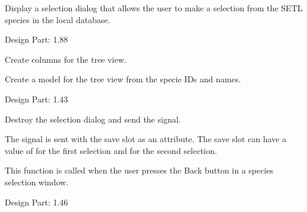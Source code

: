\documentclass[letterpaper,10pt,english]{sphinxmanual}
\begin{document}

\begin{fulllineitems}
\label{setlyze/gui:setlyze.gui.SelectSpecies}
Display a selection dialog that allows the user to make a
selection from the SETL species in the local database.

Design Part: 1.88

\begin{fulllineitems}
\label{setlyze/gui:setlyze.gui.SelectSpecies.create_columns}
Create columns for the tree view.

\end{fulllineitems}


\begin{fulllineitems}
\label{setlyze/gui:setlyze.gui.SelectSpecies.create_model}
Create a model for the tree view from the specie IDs and
names.

Design Part: 1.43

\end{fulllineitems}


\begin{fulllineitems}
\label{setlyze/gui:setlyze.gui.SelectSpecies.on_back}
Destroy the selection dialog and send the
 signal.

The  signal is sent with the save slot
as an attribute. The save slot can have a value of  for the
first selection and  for the second selection.

This function is called when the user presses the Back button in
a species selection window.

Design Part: 1.46

\end{fulllineitems}



\end{fulllineitems}
\end{document}
